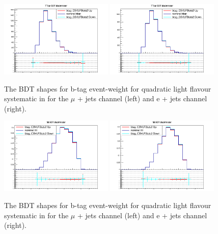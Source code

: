 \begin{figure}[ht!]
    \includegraphics[width=0.48\textwidth]{images/Run2/Sys/btag_CSVLFStats2systt.png}
    \includegraphics[width=0.48\textwidth]{images/Run2/Sys/btag_CSVLFStats2systt_e.png}     
    \caption{The BDT shapes for b-tag event-weight for quadratic light flavour systematic in \ttbar for the $\mu$ + jets channel (left) and e + jets channel (right).}
    \label{fig:SysShapesLStatstttt2}
\end{figure}
\begin{figure}[ht!]
    \includegraphics[width=0.48\textwidth]{images/Run2/Sys/btag_CSVLFStats2systttt.png}
    \includegraphics[width=0.48\textwidth]{images/Run2/Sys/btag_CSVLFStats2systttt_e.png}     
    \caption{The BDT shapes for b-tag event-weight for quadratic light flavour systematic in \tttt for the $\mu$ + jets channel (left) and e + jets channel (right).}
    \label{fig:SysShapesLStatstt2}
\end{figure}
